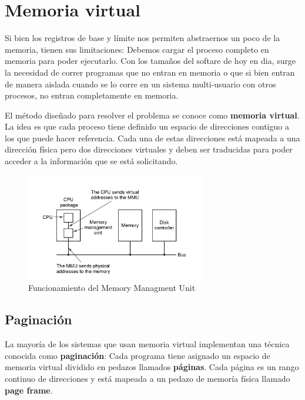 \newpage
\section{Memoria virtual}
Si bien los registros de base y límite nos permiten abstraernos un poco de la memoria, tienen sus limitaciones: Debemos cargar el proceso completo en memoria para poder ejecutarlo. Con los tamaños del softare de hoy en dia, surge la necesidad  de correr programas que no entran en memoria o que si bien entran de manera aislada cuando se lo corre en un sistema multi-usuario con otros procesos, no entran completamente en memoria.

El método diseñado para resolver el problema se conoce como \textbf{memoria virtual}. La idea es que cada proceso tiene definido un espacio de direcciones contiguo a los que puede hacer referencia. Cada una de estas direcciones está mapeada a una dirección física pero dos direcciones virtuales y deben ser traducidas para poder acceder a la información que se está solicitando.

\begin{figure}[h]
	\centering
	\includegraphics[width=0.7\textwidth]{imagenes/mmu-paging}
	\caption{Funcionamiento del Memory Managment Unit}
	\label{fig:mmu-paging}
\end{figure}

\subsection{Paginación}\label{paginacion}
La mayoría de los sistemas que usan memoria virtual implementan una técnica conocida como \textbf{paginación}: Cada programa tiene asignado un espacio de memoria virtual dividido en pedazos llamados \textbf{páginas}. Cada página es un rango continuo de direcciones y está mapeada a un pedazo de memoría física llamado \textbf{page frame}.

